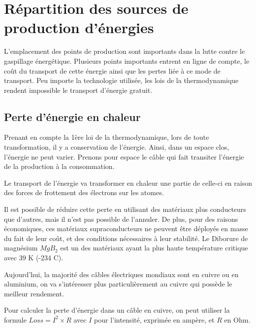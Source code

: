\chapter{Répartition des sources de production d'énergies}

L'emplacement des points de production sont importants dans la lutte contre le gaspillage énergétique.
Plusieurs points importants entrent en ligne de compte, le coût du transport de cette énergie ainsi que les pertes liée à ce mode de transport.
Peu importe la technologie utilisée, les lois de la thermodynamique rendent impossible le transport d'énergie gratuit.

\section{Perte d'énergie en chaleur}

Prenant en compte la 1ère loi de la thermodynamique, lors de toute transformation, il y a
conservation de l'énergie.
Ainsi, dans un espace clos, l'énergie ne peut varier.
Prenons pour espace le câble qui fait transiter l'énergie de la production à la consommation.

Le transport de l'énergie va transformer en chaleur une partie de celle-ci en raison
des forces de frottement des électrons sur les atomes.

Il est possible de réduire cette perte en utilisant des matériaux plus conducteurs que
d'autres, mais il n'est pas possible de l'annuler.
De plus, pour des raisons économiques, ces matériaux supraconducteurs ne peuvent être
déployés en masse du fait de leur coût, et des conditions nécessaires à leur stabilité.
Le Diborure de magnésium $MgB_2$ est un des matériaux ayant la plus haute température
critique avec 39 K (-234 C).

Aujourd'hui, la majorité des câbles électriques mondiaux sont en cuivre ou en aluminium,
on va s'intéresser plus particulièrement au cuivre qui possède le meilleur rendement.

Pour calculer la perte d'énergie dans un câble en cuivre, on peut utiliser
la formule $Loss = I^2\times R$ avec $I$ pour l'intensité, exprimée en ampère, et $R$ en Ohm.


